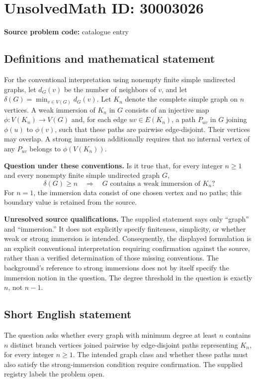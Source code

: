 \documentclass[11pt]{article}
\begin{document}
\section*{UnsolvedMath ID: 30003026}
\textbf{Source problem code:} catalogue entry
\subsection{Definitions and mathematical statement}
For the conventional interpretation using nonempty finite simple undirected graphs, let \(d_G(v)\) be the number of neighbors of \(v\), and let \(\delta(G)=\min_{v\in V(G)}d_G(v)\). Let \(K_n\) denote the complete simple graph on \(n\) vertices. A weak immersion of \(K_n\) in \(G\) consists of an injective map \(\phi:V(K_n)\to V(G)\) and, for each edge \(uv\in E(K_n)\), a path \(P_{uv}\) in \(G\) joining \(\phi(u)\) to \(\phi(v)\), such that these paths are pairwise edge-disjoint. Their vertices may overlap. A strong immersion additionally requires that no internal vertex of any \(P_{uv}\) belongs to \(\phi(V(K_n))\).

\textbf{Question under these conventions.} Is it true that, for every integer \(n\geq 1\) and every nonempty finite simple undirected graph \(G\),
\[
\delta(G)\geq n
\quad\Longrightarrow\quad
G\text{ contains a weak immersion of }K_n?
\]
For \(n=1\), the immersion data consist of one chosen vertex and no paths; this boundary value is retained from the source.

\textbf{Unresolved source qualifications.} The supplied statement says only ``graph'' and ``immersion.'' It does not explicitly specify finiteness, simplicity, or whether weak or strong immersion is intended. Consequently, the displayed formulation is an explicit conventional interpretation requiring confirmation against the source, rather than a verified determination of those missing conventions. The background's reference to strong immersions does not by itself specify the immersion notion in the question. The degree threshold in the question is exactly \(n\), not \(n-1\).
\subsection{Short English statement}
The question asks whether every graph with minimum degree at least \(n\) contains \(n\) distinct branch vertices joined pairwise by edge-disjoint paths representing \(K_n\), for every integer \(n\geq1\). The intended graph class and whether these paths must also satisfy the strong-immersion condition require confirmation. The supplied registry labels the problem open.
\end{document}
